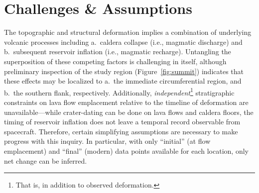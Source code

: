 \section{Challenges \& Assumptions}
The topographic and structural deformation implies a combination of underlying volcanic processes including a.\ caldera collapse (i.e., magmatic discharge) and b.\ subsequent reservoir inflation (i.e., magmatic recharge). Untangling the superposition of these competing factors is challenging in itself, although preliminary inspection of the study region (Figure~\ref{fig:summit}) indicates that these effects may be localized to a.\ the immediate circumferential region, and b.\ the southern flank, respectively. Additionally, \textit{independent}\footnote{That is, in addition to observed deformation.} stratigraphic constraints on lava flow emplacement relative to the timeline of deformation are unavailable---while crater-dating can be done on lava flows and caldera floors, the timing of reservoir inflation does not leave a temporal record observable from spacecraft. Therefore, certain simplifying assumptions are necessary to make progress with this inquiry. In particular, with only ``initial'' (at flow emplacement) and ``final'' (modern) data points available for each location, only net change can be inferred.

